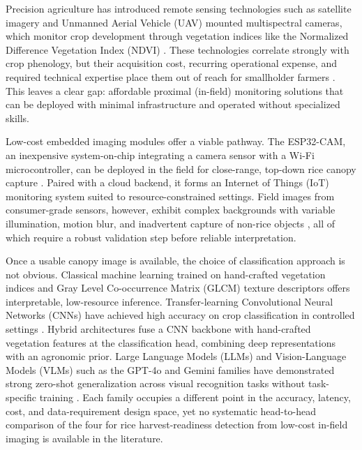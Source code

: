 Precision agriculture has introduced remote sensing technologies such as satellite imagery and Unmanned Aerial Vehicle (UAV) mounted multispectral cameras, which monitor crop development through vegetation indices like the Normalized Difference Vegetation Index (NDVI) \cite{huang2021ndvi}. These technologies correlate strongly with crop phenology, but their acquisition cost, recurring operational expense, and required technical expertise place them out of reach for smallholder farmers \cite{boursianis2022iot}. This leaves a clear gap: affordable proximal (in-field) monitoring solutions that can be deployed with minimal infrastructure and operated without specialized skills.

Low-cost embedded imaging modules offer a viable pathway. The ESP32-CAM, an inexpensive system-on-chip integrating a camera sensor with a Wi-Fi microcontroller, can be deployed in the field for close-range, top-down rice canopy capture \cite{elhattab2023esp32cam}. Paired with a cloud backend, it forms an Internet of Things (IoT) monitoring system suited to resource-constrained settings. Field images from consumer-grade sensors, however, exhibit complex backgrounds with variable illumination, motion blur, and inadvertent capture of non-rice objects \cite{tan2023riceres2net}, all of which require a robust validation step before reliable interpretation.

Once a usable canopy image is available, the choice of classification approach is not obvious. Classical machine learning trained on hand-crafted vegetation indices and Gray Level Co-occurrence Matrix (GLCM) texture descriptors offers interpretable, low-resource inference. Transfer-learning Convolutional Neural Networks (CNNs) have achieved high accuracy on crop classification in controlled settings \cite{qin2023ricephenology,tan2023riceres2net}. Hybrid architectures fuse a CNN backbone with hand-crafted vegetation features at the classification head, combining deep representations with an agronomic prior. Large Language Models (LLMs) and Vision-Language Models (VLMs) such as the GPT-4o and Gemini families have demonstrated strong zero-shot generalization across visual recognition tasks without task-specific training \cite{zhang2024vlmsurvey}. Each family occupies a different point in the accuracy, latency, cost, and data-requirement design space, yet no systematic head-to-head comparison of the four for rice harvest-readiness detection from low-cost in-field imaging is available in the literature.

